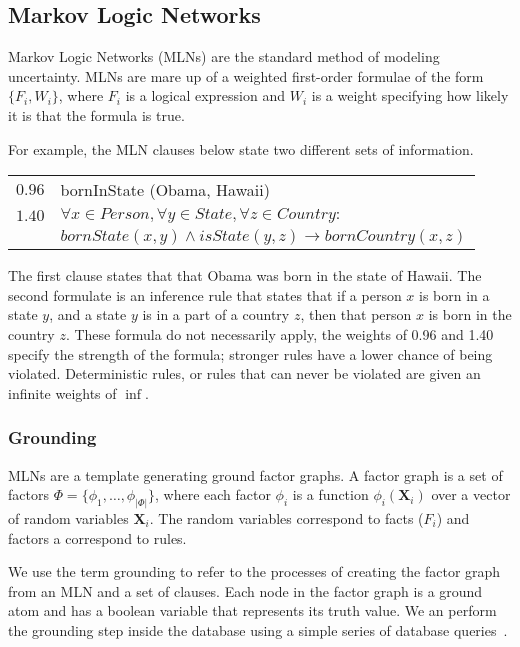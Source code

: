 \subsection{Markov Logic Networks}

Markov Logic Networks (MLNs) are the standard method of modeling uncertainty.
MLNs are mare up of a weighted first-order formulae of the form \(\{F_i, W_i\}\),
where \(F_i\) is a logical expression and \(W_i\) is a weight
specifying how likely it is that the formula is true.

For example, the MLN clauses below state two different sets of information.

\noindent\begin{tabular}{l l}
  \(0.96\) & bornInState (Obama, Hawaii) \\
  \(1.40\) & \( \forall x \in Person, \forall y \in State, \forall z \in Country: \) \\
           & \(bornState(x,y) \wedge isState(y,z) \rightarrow bornCountry(x, z)\)
\end{tabular}

The first clause states that that Obama was born in the state of Hawaii.
The second formulate is an inference rule that states that if a person \(x\) is born in a state \(y\), and a state \(y\) is in a part of a country \(z\),
then that person \(x\) is born in the country \(z\).
These formula do not necessarily apply,
the weights of 0.96 and 1.40 specify the strength of the formula; stronger rules have a lower chance of being violated.
Deterministic rules, or rules that can never be violated are given an infinite weights of $\inf$.


\subsubsection{Grounding}

MLNs are a template generating ground factor graphs.
A factor graph is a set of factors \(\Phi = \{ \phi_1, \ldots, \phi_{|\Phi|} \} \),
where each factor \(\phi_i\) is a function \(\phi_i (\mathbf{X}_i)\) over a
vector of random variables \(\mathbf{X}_i\).
The random variables correspond to facts (\(F_i\)) and factors a correspond to rules.

We use the term grounding to refer to the processes of creating the factor graph from an
MLN and a set of clauses.
Each node in the factor graph is a ground atom and has a boolean variable that represents its truth value.
We an perform the grounding step inside the database using a simple series of database queries~\cite{chen2014knowledge}.

